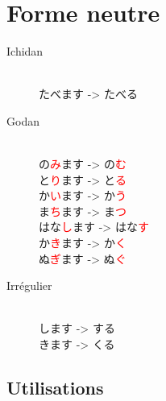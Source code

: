 \documentclass[11pt]{report}
\newenvironment{Japanese}{%
\CJKfamily{min}%
\CJKtilde  
\CJKnospace}{}
\begin{document}
\section{Forme neutre}

\begin{CJK}{UTF8}{}  
\begin{Japanese}
	\begin{description}
		\item[Ichidan] \hfill \\
			たべます -> たべる
		\item[Godan] \hfill \\
			の\textcolor{red}{み}ます -> の\textcolor{red}{む} \\
			と\textcolor{red}{り}ます -> と\textcolor{red}{る} \\
			か\textcolor{red}{い}ます -> か\textcolor{red}{う} \\
			ま\textcolor{red}{ち}ます -> ま\textcolor{red}{つ} \\
			はな\textcolor{red}{し}ます -> はな\textcolor{red}{す} \\
			か\textcolor{red}{き}ます -> か\textcolor{red}{く} \\
			ぬ\textcolor{red}{ぎ}ます -> ぬ\textcolor{red}{ぐ}
		\item[Irrégulier] \hfill \\
			します -> する \\
			きます -> くる
	\end{description}
\end{Japanese}  
\end{CJK}

\subsection{Utilisations}
\end{document}
